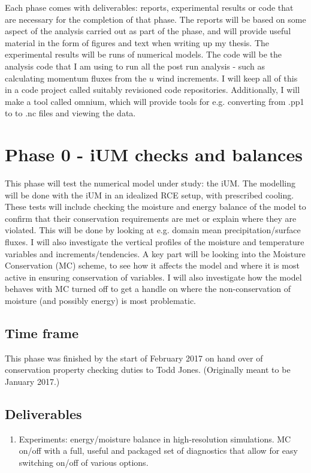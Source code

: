 \documentclass[11pt,a4paper]{article}
\begin{document}
Each phase comes with deliverables: reports, experimental results or code that are necessary for the completion of that phase. The reports will be based on some aspect of the analysis carried out as part of the phase, and will provide useful material in the form of figures and text when writing up my thesis. The experimental results will be runs of numerical models. The code will be the analysis code that I am using to run all the post run analysis - such as calculating momentum fluxes from the $u$ wind increments. I will keep all of this in a code project called suitably revisioned code repositories. Additionally, I will make a tool called omnium, which will provide tools for e.g. converting from .pp1 to to .nc files and viewing the data.

\section*{Phase 0 - iUM checks and balances}
This phase will test the numerical model under study: the iUM. The modelling will be done with the iUM in an idealized RCE setup, with prescribed cooling. These tests will include checking the moisture and energy balance of the model to confirm that their conservation requirements are met or explain where they are violated. This will be done by looking at e.g. domain mean precipitation/surface fluxes. I will also investigate the vertical profiles of the moisture and temperature variables and increments/tendencies. A key part will be looking into the Moisture Conservation (MC) scheme, to see how it affects the model and where it is most active in ensuring conservation of variables. I will also investigate how the model behaves with MC turned off to get a handle on where the non-conservation of moisture (and possibly energy) is most problematic.

\subsection*{Time frame}

This phase was finished by the start of February 2017 on hand over of conservation property checking duties to Todd Jones. (Originally meant to be January 2017.)

\subsection*{Deliverables}
\begin{enumerate}
    \item Experiments: energy/moisture balance in high-resolution simulations. MC on/off with a full, useful and packaged set of diagnostics that allow for easy switching on/off of various options.
\end{enumerate}
\end{document}
